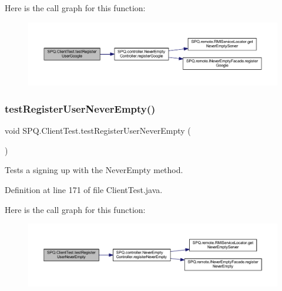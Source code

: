 Here is the call graph for this function\+:\nopagebreak
\begin{figure}[H]
\begin{center}
\leavevmode
\includegraphics[width=350pt]{class_s_p_q_1_1_client_test_a5f10079da4053b4e2c183b715c246bfa_cgraph}
\end{center}
\end{figure}
\mbox{\label{class_s_p_q_1_1_client_test_ae5a5c27b65ff1dea107d913ea609cb0c}} 
\subsubsection{\texorpdfstring{test\+Register\+User\+Never\+Empty()}{testRegisterUserNeverEmpty()}}
{\footnotesize\ttfamily void S\+P\+Q.\+Client\+Test.\+test\+Register\+User\+Never\+Empty (\begin{DoxyParamCaption}{ }\end{DoxyParamCaption})}

Tests a signing up with the Never\+Empty method. 

Definition at line 171 of file Client\+Test.\+java.

Here is the call graph for this function\+:\nopagebreak
\begin{figure}[H]
\begin{center}
\leavevmode
\includegraphics[width=350pt]{class_s_p_q_1_1_client_test_ae5a5c27b65ff1dea107d913ea609cb0c_cgraph}
\end{center}
\end{figure}
\mbox{\label{class_s_p_q_1_1_client_test_add97afff5978c2f1b8e950cc4942eda5}} 
